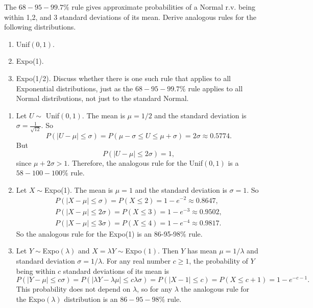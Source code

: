 

\setcounter{theorem}{5}
\begin{exercise}[BH.5.6] The $68-95-99.7\%$ rule gives approximate probabilities of a Normal r.v. being within 1,2, and 3 standard deviations of its mean. Derive analogous rules for the following distributions.
	\begin{enumerate}
		\item {Unif}$(0,1)$.
		\item Expo(1).
		\item Expo(1/2). Discuss whether there is one such rule that applies to all Exponential distributions, just as the $68-95-99.7 \%$ rule applies to all Normal distributions, not just to the standard Normal.
	\end{enumerate}
\begin{solution}
    \begin{enumerate}
        \item Let $U \sim$  {Unif}$(0,1)$. The mean is $\mu=1 / 2$ and the standard deviation is $\sigma=\frac{1}{\sqrt{12}}$. So
        $$
        P(|U-\mu| \leq \sigma)=P(\mu-\sigma \leq U \leq \mu+\sigma)=2 \sigma \approx 0.5774 .
        $$
        But
        $$
        P(|U-\mu| \leq 2 \sigma)=1,
        $$
        since $\mu+2 \sigma>1$. Therefore, the analogous rule for the  {Unif}$(0,1)$ is a $58-100-100 \%$ rule.
        \item Let $X \sim${Expo}(1). The mean is $\mu=1$ and the standard deviation is $\sigma=1$. So
        $$
        \begin{gathered}
            P(|X-\mu| \leq \sigma)=P(X \leq 2)=1-e^{-2} \approx 0.8647, \\
            P(|X-\mu| \leq 2 \sigma)=P(X \leq 3)=1-e^{-3} \approx 0.9502, \\
            P(|X-\mu| \leq 3 \sigma)=P(X \leq 4)=1-e^{-4} \approx 0.9817 .
        \end{gathered}
        $$
        So the analogous rule for the Expo(1) is an 86-95-98\% rule.
        \item Let $Y \sim${Expo}$(\lambda)$ and $X=\lambda Y \sim${Expo}$(1)$. Then $Y$ has mean $\mu=1 / \lambda$ and standard deviation $\sigma=1 / \lambda$. For any real number $c \geq 1$, the probability of $Y$ being within $c$ standard deviations of its mean is
        $$
        P(|Y-\mu| \leq c \sigma)=P(|\lambda Y-\lambda \mu| \leq c \lambda \sigma)=P(|X-1| \leq c)=P(X \leq c+1)=1-e^{-c-1} .
        $$
        This probability does not depend on $\lambda$, so for any $\lambda$ the analogous rule for the   {Expo}$(\lambda)$ distribution is an $86-95-98 \%$ rule.
    \end{enumerate}
\end{solution}
\end{exercise}


